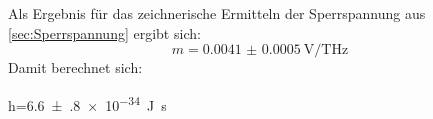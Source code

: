 Als Ergebnis für das zeichnerische Ermitteln der Sperrspannung aus \cref{sec:Sperrspannung} ergibt sich:
\[m=\qty{0.0041(5)}{\volt\per\tera\hertz}\]
Damit berechnet sich:
\begin{rb}
h=\qty{6.6(8)e-34}{\joule\s}
\end{rb}

\clearpage
{}




